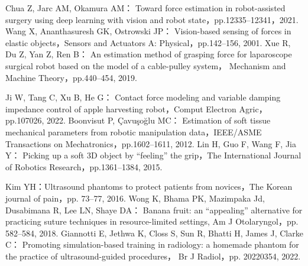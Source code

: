 \documentclass[a4paper]{jarticle}
\begin{document}
\begin{thebibliography}{9}
    Chua Z, Jarc AM, Okamura AM：
    Toward force estimation in robot-assisted surgery using deep learning with vision and robot state，pp.12335–12341，2021.
    Wang X, Ananthasuresh GK, Ostrowski JP：
    Vision-based sensing of forces in elastic objects，Sensors and Actuators A: Physical，pp.142–156, 2001.
    Xue R, Du Z, Yan Z, Ren B：
    An estimation method of grasping force for laparoscope surgical robot based on the model of a cable-pulley system，
    Mechanism and Machine Theory，pp.440–454, 2019.

    Ji W, Tang C, Xu B, He G：
    Contact force modeling and variable damping impedance control of apple harvesting robot，Comput Electron Agric，pp.107026, 2022.
    Boonvisut P, Çavuşoğlu MC：
    Estimation of soft tissue mechanical parameters from robotic manipulation data，IEEE/ASME Transactions on Mechatronics，pp.1602–1611, 2012.
    Lin H, Guo F, Wang F, Jia Y：
    Picking up a soft 3D object by “feeling” the grip，The International Journal of Robotics Research，pp.1361–1384, 2015.

    Kim YH：Ultrasound phantoms to protect patients from novices，The Korean journal of pain，pp. 73–77, 2016.
    Wong K, Bhama PK, Mazimpaka Jd, Dusabimana R, Lee LN, Shaye DA：
    Banana fruit: an “appealing” alternative for practicing suture techniques in resource-limited settings, 
    Am J Otolaryngol，pp. 582–584, 2018.
    Giannotti E, Jethwa K, Closs S, Sun R, Bhatti H, James J, Clarke C：
    Promoting simulation-based training in radiology: a homemade phantom for the practice of ultrasound-guided procedures，
    Br J Radiol，pp. 20220354, 2022.




    

\end{thebibliography}
\end{document}
